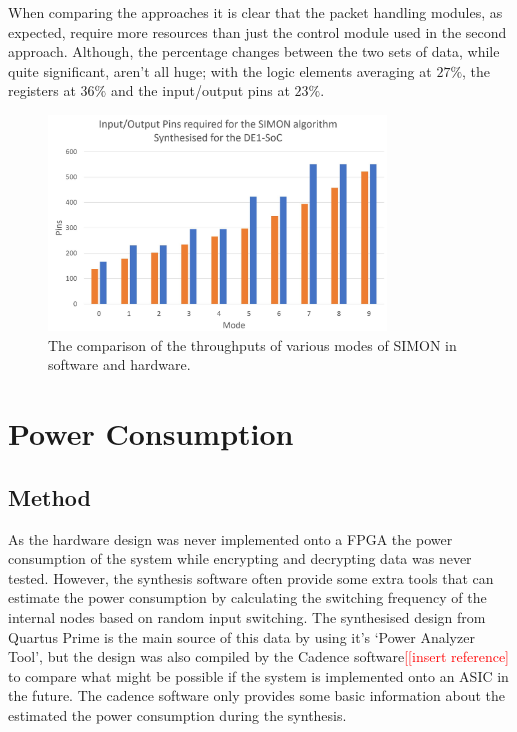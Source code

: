 \documentclass[12pt,twoside,a4paper]{report}
\begin{document}
	When comparing the approaches it is clear that the packet handling modules, as expected, require more resources than just the control module used in the second approach. Although, the percentage changes between the two sets of data, while quite significant, aren't all huge; with the logic elements averaging at $27\%$, the registers at $36\%$ and the input/output pins at $23\%$.
	
	\begin{figure}[H]
		\includegraphics[width=0.8\textwidth]{SIMON_pins}
		\centering
		\caption{The comparison of the throughputs of various modes of SIMON in software and hardware.}
		\label{fig:pins}
	\end{figure}
	
	\section{Power Consumption}
	
	\subsection{Method}
	
	As the hardware design was never implemented onto a FPGA the power consumption of the system while encrypting and decrypting data was never tested. However, the synthesis software often provide some extra tools that can estimate the power consumption by calculating the switching frequency of the internal nodes based on random input switching. The synthesised design from Quartus Prime is the main source of this data by using it's `Power Analyzer Tool', but the design was also compiled by the Cadence software\textcolor{red}{[[insert reference]} to compare what might be possible if the system is implemented onto an ASIC in the future.  The cadence software only provides some basic information about the estimated  the power consumption during the synthesis.
	
\end{document}
